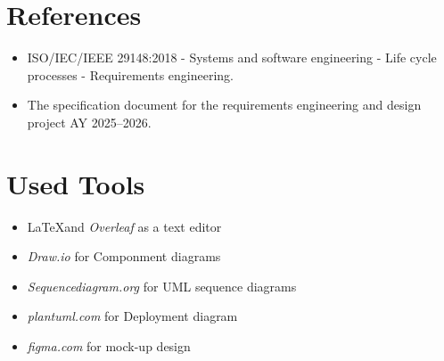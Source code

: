 \section{References}
\label{sec:references}%

\begin{itemize}
    \item ISO/IEC/IEEE 29148:2018 - Systems and software engineering - Life cycle processes - Requirements engineering.
    \item The specification document for the requirements engineering and design project AY 2025–2026. 
\end{itemize}

\section{Used Tools}
\label{sec:used_tools}%
\begin{itemize}
    \item \LaTeX and \textit{Overleaf} as a text editor
    \item \textit{Draw.io} for Componment diagrams
    \item \textit{Sequencediagram.org} for UML sequence diagrams
    \item \textit{plantuml.com} for Deployment diagram
    \item \textit{figma.com} for mock-up design
\end{itemize}